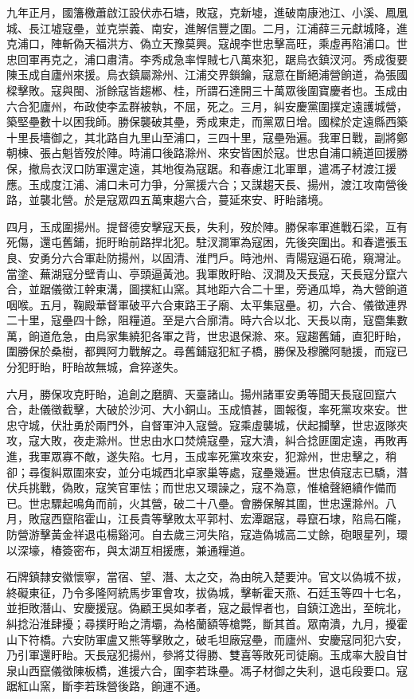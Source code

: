 \begin{pinyinscope}
九年正月，國籓檄蕭啟江設伏赤石塘，敗寇，克新墟，進破南康池江、小溪、鳳凰城、長江墟寇壘，並克崇義、南安，進解信豐之圍。二月，江浦薛三元獻城降，進克浦口，陣斬偽天福洪方、偽立天豫莫興。寇覘李世忠擊高旺，乘虛再陷浦口。世忠回軍再克之，浦口肅清。李秀成急率悍賊七八萬來犯，踞烏衣鎮汊河。秀成復要陳玉成自廬州來援。烏衣鎮屬滁州、江浦交界鎖鑰，寇意在斷絕浦營餉道，為張國樑擊敗。寇與閩、浙餘寇皆趨郴、桂，所謂石達開三十萬眾後圍寶慶者也。玉成由六合犯廬州，布政使李孟群被執，不屈，死之。三月，糾安慶黨圍撲定遠護城營，築堅壘數十以困我師。勝保襲破其壘，秀成東走，而黨眾日增。國樑於定遠縣西築十里長墻御之，其北路自九里山至浦口，三四十里，寇壘殆遍。我軍日戰，副將鄭朝棟、張占魁皆歿於陣。時浦口後路滁州、來安皆困於寇。世忠自浦口繞道回援勝保，撤烏衣汊口防軍還定遠，其地復為寇踞。和春慮江北軍單，遣馮子材渡江援應。玉成度江浦、浦口未可力爭，分黨援六合；又謀趨天長、揚州，渡江攻南營後路，並襲北營。於是寇眾四五萬東趨六合，蔓延來安、盱眙諸境。

四月，玉成圍揚州。提督德安擊寇天長，失利，歿於陣。勝保率軍進戰石梁，互有死傷，還屯舊鋪，扼盱眙前路捍北犯。駐汊澗軍為寇困，先後突圍出。和春遣張玉良、安勇分六合軍赴防揚州，以固清、淮門戶。時池州、青陽寇逼石硊，窺灣沚。當塗、蕪湖寇分壁青山、亭頭逼黃池。我軍敗盱眙、汊澗及天長寇，天長寇分竄六合，並踞儀徵江幹東溝，圖撲紅山窯。其地距六合二十里，旁通瓜埠，為大營餉道咽喉。五月，鞠殿華督軍破平六合東路王子廟、太平集寇壘。初，六合、儀徵連界二十里，寇壘四十餘，阻糧道。至是六合廓清。時六合以北、天長以南，寇麕集數萬，餉道危急，由烏家集繞犯各軍之背，世忠退保滁、來。寇趨舊鋪，直犯盱眙，圍勝保於桑樹，都興阿力戰解之。尋舊鋪寇犯紅子橋，勝保及穆騰阿馳援，而寇已分犯盱眙，盱眙故無城，倉猝遂失。

六月，勝保攻克盱眙，追創之磨臍、天臺諸山。揚州諸軍安勇等聞天長寇回竄六合，赴儀徵截擊，大破於沙河、大小銅山。玉成憤甚，圖報復，率死黨攻來安。世忠守城，伏壯勇於兩門外，自督軍沖入寇營。寇乘虛襲城，伏起攔擊，世忠返隊夾攻，寇大敗，夜走滁州。世忠由水口焚燒寇壘，寇大潰，糾合捻匪圍定遠，再敗再進，我軍眾寡不敵，遂失陷。七月，玉成率死黨攻來安，犯滁州，世忠擊之，稍卻；尋復糾眾圍來安，並分屯城西北卓家巢等處，寇壘幾遍。世忠偵寇志已驕，潛伏兵挑戰，偽敗，寇笑官軍怯；而世忠又環譟之，寇不為意，惟槍聲絕續作備而已。世忠驟起鳴角而前，火其營，破二十八壘。會勝保解其圍，世忠還滁州。八月，敗寇西竄陷霍山，江長貴等擊敗太平郭村、宏潭踞寇，尋竄石埭，陷烏石隴，防營游擊黃金祥退屯楊谿河。自去歲三河失陷，寇造偽城高二丈餘，砲眼星列，環以深壕，椿簽密布，與太湖互相援應，兼通糧道。

石牌鎮隸安徽懷寧，當宿、望、潛、太之交，為由皖入楚要沖。官文以偽城不拔，終礙東征，乃令多隆阿統馬步軍會攻，拔偽城，擊斬霍天燕、石廷玉等四十七名，並拒敗潛山、安慶援寇。偽顧王吳如孝者，寇之最悍者也，自鎮江逸出，至皖北，糾捻沿淮肆擾；尋撲盱眙之清壩，為格蘭額等槍斃，斷其首。眾南潰，九月，擾霍山下符橋。六安防軍盧又熊等擊敗之，破毛坦廠寇壘，而廬州、安慶寇同犯六安，乃引軍還盱眙。天長寇犯揚州，參將艾得勝、雙喜等敗死司徒廟。玉成率大股自甘泉山西竄儀徵陳板橋，進援六合，圍李若珠壘。馮子材御之失利，退屯段要口。寇踞紅山窯，斷李若珠營後路，餉運不通。


\end{pinyinscope}

